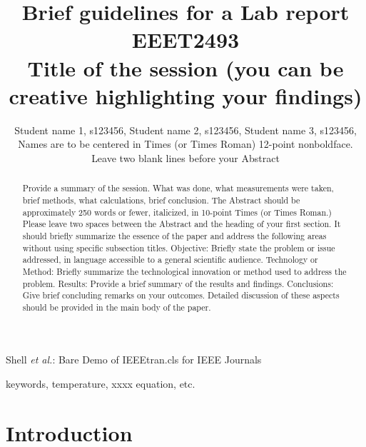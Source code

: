 \documentclass[journal]{IEEEtran}
\begin{document}
\title{Brief guidelines for a Lab report EEET2493\\ \small{Title of the session (you can be creative highlighting your findings)}}

\author{Student name 1, s123456,
        Student name 2, s123456,
        Student name 3, s123456,
        {\small Names are to be centered in Times 
(or Times Roman) 12-point nonboldface. Leave two blank lines before your Abstract}}%
        
{Shell \MakeLowercase{\textit{et al.}}: Bare Demo of IEEEtran.cls for IEEE Journals}

\maketitle

\begin{abstract}
Provide a summary of the session. What was done, 
what measurements were taken, brief methods, what calculations, brief conclusion.  The Abstract should be approximately 250 words or fewer, italicized, in 10-point Times (or Times Roman.) Please leave two spaces between the Abstract and the heading of your first section.
It should briefly summarize the essence of the paper and address the following areas without using specific subsection titles. Objective: Briefly state the problem or issue addressed, in language accessible to a general scientific audience. Technology or Method: Briefly summarize the technological innovation or method used to address the problem. Results: Provide a brief summary of the results and findings. Conclusions: Give brief concluding remarks on your outcomes. Detailed discussion of these aspects should be provided in the main body of the paper.
\end{abstract}

\begin{IEEEkeywords}
keywords, temperature, xxxx equation, etc.
\end{IEEEkeywords}

\section{Introduction}
\end{document}
